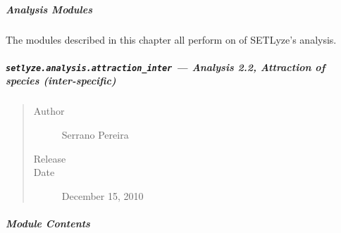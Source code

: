 \documentclass[letterpaper,10pt,english]{sphinxmanual}
\begin{document}
\subparagraph{Analysis Modules}
\label{setlyze_modules_analysis::doc}\label{setlyze_modules_analysis:analysis-modules}
The modules described in this chapter all perform on of SETLyze's
analysis.


\subparagraph{\texttt{setlyze.analysis.attraction\_inter} --- Analysis 2.2, Attraction of species (inter-specific)}
\label{setlyze/analysis/attraction_inter::doc}\label{setlyze/analysis/attraction_inter:setlyze-analysis-attraction-inter-analysis-2-2-attraction-of-species-inter-specific}\begin{quote}\begin{description}
\item[{Author}] \leavevmode
Serrano Pereira

\item[{Release}] 

\item[{Date}] \leavevmode
December 15, 2010

\end{description}\end{quote}


\subparagraph{Module Contents}
\label{setlyze/analysis/attraction_inter:module-setlyze.analysis.attraction_inter}\label{setlyze/analysis/attraction_inter:module-contents}
\end{document}

